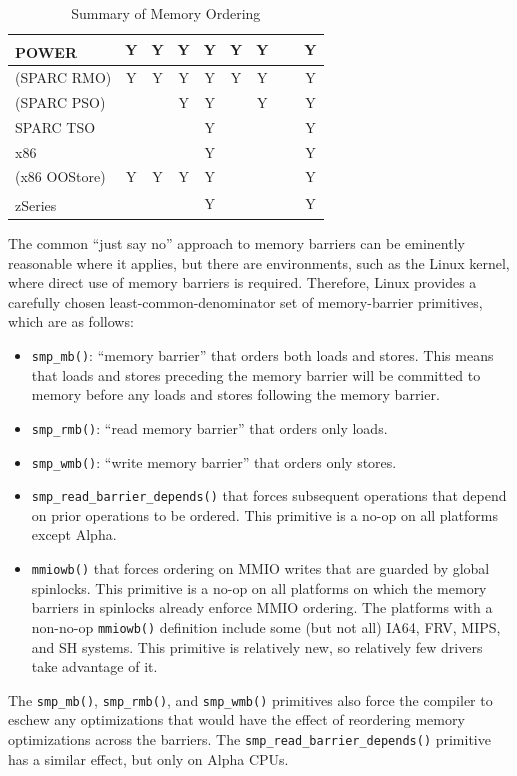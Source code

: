 \begin{table}
\begin{center}
\begin{tabular}{l|c|c|c|c|c|c|c|c}
	\hline
	POWER\textsuperscript{\texttrademark}
			& Y & Y & Y & Y   & Y & Y & ~ & Y \\
	\hline
	(SPARC RMO)	& Y & Y & Y & Y   & Y & Y & ~ & Y \\
	\hline
	(SPARC PSO)	& ~ & ~ & Y & Y   & ~ & Y & ~ & Y \\
	\hline
	SPARC TSO	& ~ & ~ & ~ & Y   & ~ & ~ & ~ & Y \\
	\hline
	x86		& ~ & ~ & ~ & Y   & ~ & ~ & ~ & Y \\
	\hline
	(x86 OOStore)	& Y & Y & Y & Y   & ~ & ~ & ~ & Y \\
	\hline
	zSeries\textsuperscript{\textregistered}
			& ~ & ~ & ~ & Y   & ~ & ~ & ~ & Y \\
\end{tabular}
\end{center}
\caption{Summary of Memory Ordering}
\label{tab:app:whymb:Summary of Memory Ordering}
\end{table}

The common ``just say no'' approach to memory barriers
can be eminently reasonable where it applies,
but there are environments, such as the Linux kernel, where direct
use of memory barriers is required.
Therefore,
Linux provides a carefully chosen least-common-denominator
set of memory-barrier primitives, which are as follows:
\begin{itemize}
\item	{\tt smp\_mb()}: ``memory barrier'' that orders both loads and
	stores.
	This means that loads and stores preceding the memory barrier
	will be committed to memory before any loads and stores
	following the memory barrier.
\item	{\tt smp\_rmb()}: ``read memory barrier'' that orders only loads.
\item	{\tt smp\_wmb()}: ``write memory barrier'' that orders only stores.
\item	{\tt smp\_read\_barrier\_depends()} that forces subsequent operations
	that depend on prior operations to be ordered.
	This primitive is a no-op on all platforms except Alpha.
\item	{\tt mmiowb()} that forces ordering on MMIO writes that are guarded
	by global spinlocks.
	This primitive is a no-op on all platforms on which the memory
	barriers in spinlocks already enforce MMIO ordering.
	The platforms with a non-no-op {\tt mmiowb()} definition include
	some (but not all) IA64, FRV, MIPS, and SH systems.
	This primitive is relatively new, so relatively few drivers take
	advantage of it.
\end{itemize}
The {\tt smp\_mb()}, {\tt smp\_rmb()}, and {\tt smp\_wmb()}
primitives also force
the compiler to eschew any optimizations that would have the effect
of reordering memory optimizations across the barriers.
The {\tt smp\_read\_barrier\_depends()} primitive has a similar effect, but
only on Alpha CPUs.


